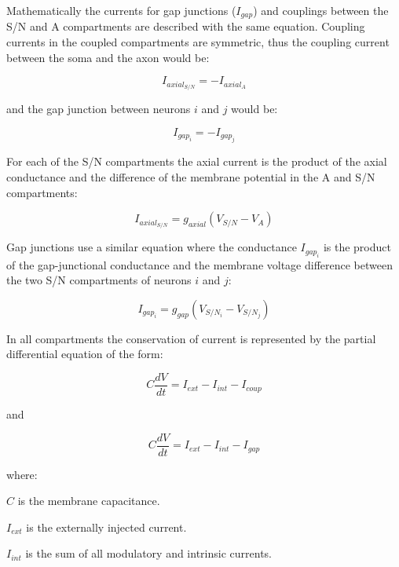 Mathematically the currents for gap junctions ($I_{gap}$) and couplings between the S/N and A compartments are described with the same equation. Coupling currents in the coupled compartments are symmetric, thus the coupling current between the soma and the axon would be:

\begin{equation}
\label{eq:coup}
I_{axial_{S/N}} = -I_{axial_{A}}
\end{equation}

and the gap junction between neurons $i$ and $j$ would be:

\begin{equation}
\label{eq:gap}
I_{gap_{i}}=-I_{gap_{j}}
\end{equation}

For each of the S/N compartments the axial current is the product of the axial conductance and the difference of the membrane potential in the A and S/N compartments:

\begin{equation}
\label{eq:axial_conductance}
I_{axial_{S/N}} = g_{axial}(V_{S/N} - V_{A})
\end{equation}

Gap junctions use a similar equation where the conductance $I_{gap_{i}}$ is the product of the gap-junctional conductance and the membrane voltage difference between the two S/N compartments of neurons $i$ and $j$:

\begin{equation}
\label{eq:gap_conductance}
I_{gap_{i}} = g_{gap}(V_{S/N_{i}} - V_{S/N_{j}})
\end{equation}

In all compartments the conservation of current is represented by the partial differential equation of the form:

\begin{equation}
C\frac{dV}{dt} = I_{ext} - I_{int} - I_{coup}
\end{equation} 

and 

\begin{equation}
C\frac{dV}{dt} = I_{ext} - I_{int} - I_{gap}
\end{equation} 


where:

$C$ is the membrane capacitance.

$I_{ext}$ is the externally injected current.

$I_{int}$ is the sum of all modulatory and intrinsic currents.

